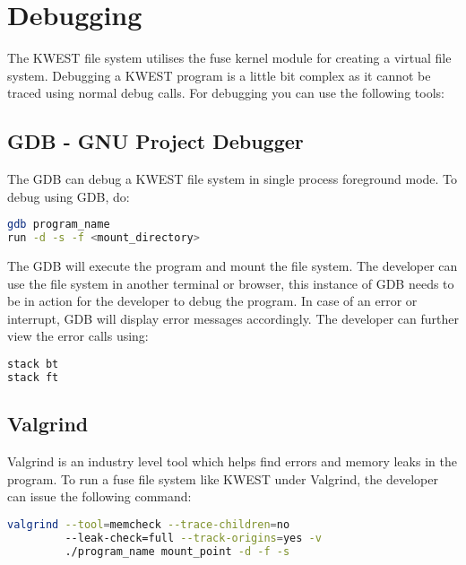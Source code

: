 \section{Debugging}
The KWEST file system utilises the fuse kernel module for creating a virtual file system. Debugging a KWEST program is a little bit complex as it cannot be traced using normal debug calls. For debugging you can use the following tools:
\subsection*{GDB - GNU Project Debugger}
The GDB can debug a KWEST file system in single process foreground mode. To debug using GDB, do:
\begin{lstlisting}[language=bash,frame=single]
gdb program_name
run -d -s -f <mount_directory>
\end{lstlisting}
The GDB will execute the program and mount the file system. The developer can use the file system in another terminal or browser, this instance of GDB needs to be in action for the developer to debug the program. In case of an error or interrupt, GDB will display error messages accordingly. The developer can further view the error calls using:
\begin{lstlisting}[language=bash,frame=single]
stack bt
stack ft
\end{lstlisting}

\subsection*{Valgrind}
Valgrind is an industry level tool which helps find errors and memory leaks in the program. To run a fuse file system like KWEST under Valgrind, the developer can issue the following command:
\begin{lstlisting}[language=bash,frame=single]
valgrind --tool=memcheck --trace-children=no 
         --leak-check=full --track-origins=yes -v 
         ./program_name mount_point -d -f -s
\end{lstlisting}

